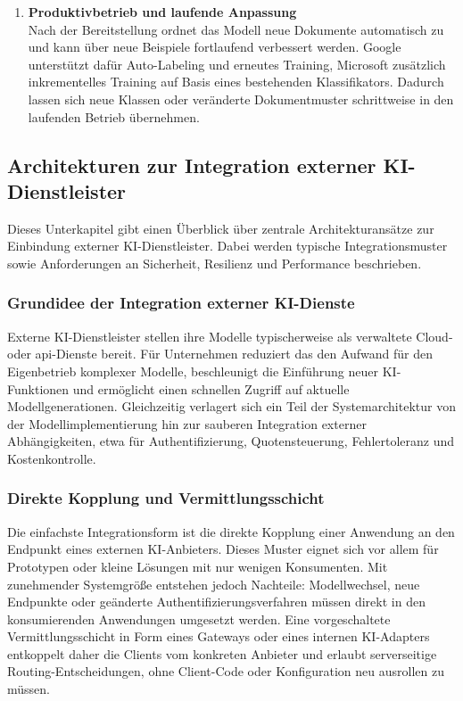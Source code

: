 \begin{enumerate}
    \item \textbf{Produktivbetrieb und laufende Anpassung} \\ Nach der Bereitstellung ordnet das Modell neue Dokumente automatisch zu und kann über neue Beispiele fortlaufend verbessert werden. Google unterstützt dafür Auto-Labeling und erneutes Training, Microsoft zusätzlich inkrementelles Training auf Basis eines bestehenden Klassifikators. Dadurch lassen sich neue Klassen oder veränderte Dokumentmuster schrittweise in den laufenden Betrieb übernehmen. \cite{googlecloud_documentai_custom_classifier,azure_document_intelligence_custom_classifier}
\end{enumerate} 

\subsection{Architekturen zur Integration externer KI-Dienstleister }

Dieses Unterkapitel gibt einen Überblick über zentrale Architekturansätze zur Einbindung externer KI-Dienstleister. Dabei werden typische Integrationsmuster sowie Anforderungen an Sicherheit, Resilienz und Performance beschrieben.

\subsubsection{Grundidee der Integration externer KI-Dienste}

Externe KI-Dienstleister stellen ihre Modelle typischerweise als verwaltete Cloud- oder \acrshort{api}-Dienste bereit. Für Unternehmen reduziert das den Aufwand für den Eigenbetrieb komplexer Modelle, beschleunigt die Einführung neuer KI-Funktionen und ermöglicht einen schnellen Zugriff auf aktuelle Modellgenerationen. Gleichzeitig verlagert sich ein Teil der Systemarchitektur von der Modellimplementierung hin zur sauberen Integration externer Abhängigkeiten, etwa für Authentifizierung, Quotensteuerung, Fehlertoleranz und Kostenkontrolle. \cite{griesch2024ki,azure_ai_gateway_apim}

\subsubsection{Direkte Kopplung und Vermittlungsschicht}

Die einfachste Integrationsform ist die direkte Kopplung einer Anwendung an den Endpunkt eines externen KI-Anbieters. Dieses Muster eignet sich vor allem für Prototypen oder kleine Lösungen mit nur wenigen Konsumenten. Mit zunehmender Systemgröße entstehen jedoch Nachteile: Modellwechsel, neue Endpunkte oder geänderte Authentifizierungsverfahren müssen direkt in den konsumierenden Anwendungen umgesetzt werden. Eine vorgeschaltete Vermittlungsschicht in Form eines Gateways oder eines internen KI-Adapters entkoppelt daher die Clients vom konkreten Anbieter und erlaubt serverseitige Routing-Entscheidungen, ohne Client-Code oder Konfiguration neu ausrollen zu müssen. \cite{azure_openai_gateway_multi_backend}

